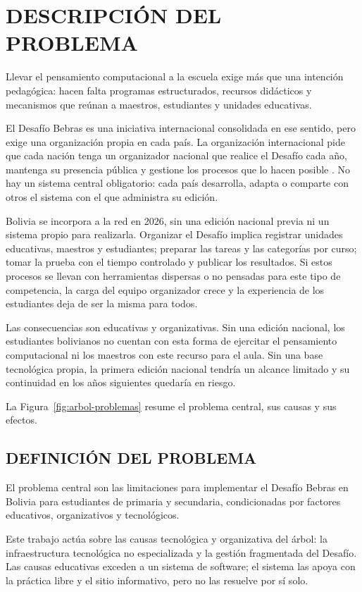 
\section{DESCRIPCIÓN DEL PROBLEMA}

Llevar el pensamiento computacional a la escuela exige más que una intención pedagógica: hacen falta programas estructurados, recursos didácticos y mecanismos que reúnan a maestros, estudiantes y unidades educativas.

El Desafío Bebras es una iniciativa internacional consolidada en ese sentido, pero exige una organización propia en cada país. La organización internacional pide que cada nación tenga un organizador nacional que realice el Desafío cada año, mantenga su presencia pública y gestione los procesos que lo hacen posible \parencite{bebras}. No hay un sistema central obligatorio: cada país desarrolla, adapta o comparte con otros el sistema con el que administra su edición.

Bolivia se incorpora a la red en 2026, sin una edición nacional previa ni un sistema propio para realizarla. Organizar el Desafío implica registrar unidades educativas, maestros y estudiantes; preparar las tareas y las categorías por curso; tomar la prueba con el tiempo controlado y publicar los resultados. Si estos procesos se llevan con herramientas dispersas o no pensadas para este tipo de competencia, la carga del equipo organizador crece y la experiencia de los estudiantes deja de ser la misma para todos.

Las consecuencias son educativas y organizativas. Sin una edición nacional, los estudiantes bolivianos no cuentan con esta forma de ejercitar el pensamiento computacional ni los maestros con este recurso para el aula. Sin una base tecnológica propia, la primera edición nacional tendría un alcance limitado y su continuidad en los años siguientes quedaría en riesgo.

La Figura~\ref{fig:arbol-problemas} resume el problema central, sus causas y sus efectos.



\subsection{DEFINICIÓN DEL PROBLEMA}

El problema central son las limitaciones para implementar el Desafío Bebras en Bolivia para estudiantes de primaria y secundaria, condicionadas por factores educativos, organizativos y tecnológicos.

Este trabajo actúa sobre las causas tecnológica y organizativa del árbol: la infraestructura tecnológica no especializada y la gestión fragmentada del Desafío. Las causas educativas exceden a un sistema de software; el sistema las apoya con la práctica libre y el sitio informativo, pero no las resuelve por sí solo.
\clearpage
